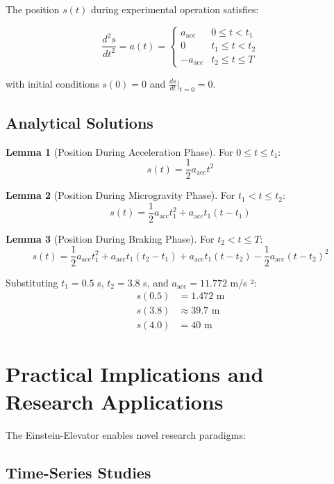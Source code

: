 ﻿\documentclass[a4paper,12pt]{article}
\theoremstyle{definition}
\newtheorem{lemma}{Lemma}
\begin{document}
The position $s(t)$ during experimental operation satisfies:

\begin{equation}
\frac{d^2s}{dt^2} = a(t) = \begin{cases}
a_{\text{acc}} & 0 \leq t < t_1 \\
0 & t_1 \leq t < t_2 \\
-a_{\text{acc}} & t_2 \leq t \leq T
\end{cases}
\end{equation}

with initial conditions $s(0) = 0$ and $\frac{ds}{dt}|_{t=0} = 0$.

\subsection{Analytical Solutions}

\begin{lemma}[Position During Acceleration Phase]
For $0 \leq t \leq t_1$:
\[
s(t) = \frac{1}{2} a_{\text{acc}} t^2
\]
\end{lemma}

\begin{lemma}[Position During Microgravity Phase]
For $t_1 < t \leq t_2$:
\[
s(t) = \frac{1}{2} a_{\text{acc}} t_1^2 + a_{\text{acc}} t_1 (t - t_1)
\]
\end{lemma}

\begin{lemma}[Position During Braking Phase]
For $t_2 < t \leq T$:
\[
s(t) = \frac{1}{2} a_{\text{acc}} t_1^2 + a_{\text{acc}} t_1 (t_2 - t_1) + a_{\text{acc}} t_1 (t - t_2) - \frac{1}{2} a_{\text{acc}} (t - t_2)^2
\]
\end{lemma}

Substituting $t_1 = 0.5$ s, $t_2 = 3.8$ s, and $a_{\text{acc}} = 11.772$ m/s ²:
\begin{align}
s(0.5) &= 1.472 \text{ m} \\
s(3.8) &\approx 39.7 \text{ m} \\
s(4.0) &= 40 \text{ m}
\end{align}

\section{Practical Implications and Research Applications}

The Einstein-Elevator enables novel research paradigms:

\subsection{Time-Series Studies}
\end{document}
